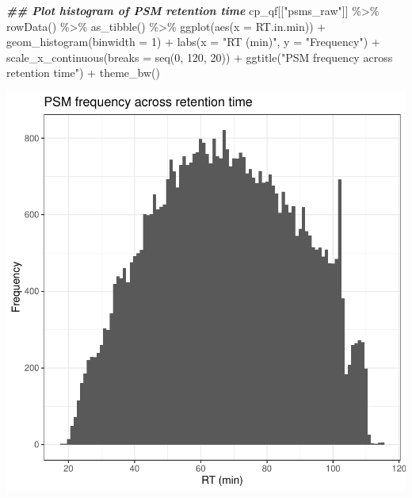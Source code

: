 \documentclass[9pt,a4paper,]{extarticle}
\newenvironment{Shaded}{\begin{snugshade}}{\end{snugshade}}
\newcommand{\AttributeTok}[1]{\textcolor[rgb]{0.77,0.63,0.00}{#1}}
\newcommand{\DecValTok}[1]{\textcolor[rgb]{0.00,0.00,0.81}{#1}}
\newcommand{\DocumentationTok}[1]{\textcolor[rgb]{0.56,0.35,0.01}{\textbf{\textit{#1}}}}
\newcommand{\FunctionTok}[1]{\textcolor[rgb]{0.00,0.00,0.00}{#1}}
\newcommand{\NormalTok}[1]{#1}
\newcommand{\SpecialCharTok}[1]{\textcolor[rgb]{0.00,0.00,0.00}{#1}}
\newcommand{\StringTok}[1]{\textcolor[rgb]{0.31,0.60,0.02}{#1}}
\begin{document}
\begin{Shaded}
\begin{Highlighting}[]
\DocumentationTok{\#\# Plot histogram of PSM retention time}
\NormalTok{cp\_qf[[}\StringTok{"psms\_raw"}\NormalTok{]] }\SpecialCharTok{\%\textgreater{}\%}
  \FunctionTok{rowData}\NormalTok{() }\SpecialCharTok{\%\textgreater{}\%} 
  \FunctionTok{as\_tibble}\NormalTok{() }\SpecialCharTok{\%\textgreater{}\%}
  \FunctionTok{ggplot}\NormalTok{(}\FunctionTok{aes}\NormalTok{(}\AttributeTok{x =}\NormalTok{ RT.in.min)) }\SpecialCharTok{+}
  \FunctionTok{geom\_histogram}\NormalTok{(}\AttributeTok{binwidth =} \DecValTok{1}\NormalTok{) }\SpecialCharTok{+}
  \FunctionTok{labs}\NormalTok{(}\AttributeTok{x =} \StringTok{"RT (min)"}\NormalTok{, }\AttributeTok{y =} \StringTok{"Frequency"}\NormalTok{) }\SpecialCharTok{+}
  \FunctionTok{scale\_x\_continuous}\NormalTok{(}\AttributeTok{breaks =} \FunctionTok{seq}\NormalTok{(}\DecValTok{0}\NormalTok{, }\DecValTok{120}\NormalTok{, }\DecValTok{20}\NormalTok{)) }\SpecialCharTok{+}
  \FunctionTok{ggtitle}\NormalTok{(}\StringTok{"PSM frequency across retention time"}\NormalTok{) }\SpecialCharTok{+}
  \FunctionTok{theme\_bw}\NormalTok{()}
\end{Highlighting}
\end{Shaded}

\begin{center}\includegraphics[height=0.3\textheight]{workflow_expressions_files/figure-latex/tmt_RT-1} \end{center}
\end{document}
